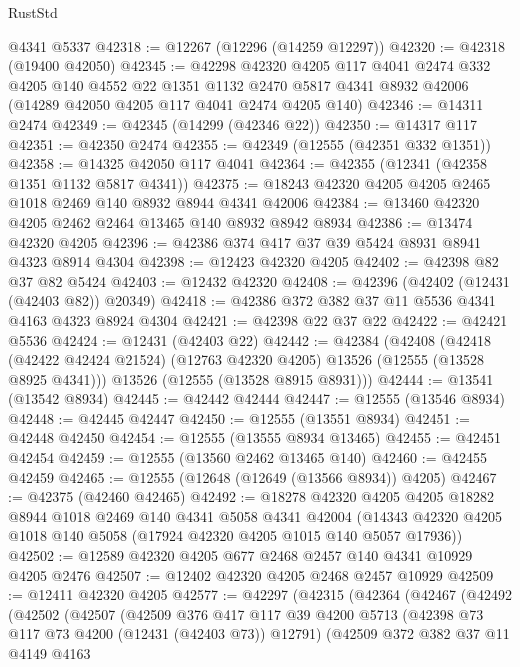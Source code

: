 \begin{lexlean}{RustStd}
\begin{coremodule}
    @4341
    @5337
@42318 := @12267 (@12296 (@14259 @12297))
@42320 := @42318 (@19400 @42050)
@42345 := @42298
    @42320
    @4205
    @117
    @4041
    @2474
    @332
    @4205
    @140
    @4552
    @22
    @1351
    @1132
    @2470
    @5817
    @4341
    @8932
    @42006
    (@14289 @42050 @4205 @117 @4041 @2474 @4205 @140)
@42346 := @14311 @2474
@42349 := @42345 (@14299 (@42346 @22))
@42350 := @14317 @117
@42351 := @42350 @2474
@42355 := @42349 (@12555 (@42351 @332 @1351))
@42358 := @14325 @42050 @117 @4041
@42364 := @42355 (@12341 (@42358 @1351 @1132 @5817 @4341))
@42375 := @18243 @42320 @4205 @4205 @2465 @1018 @2469 @140 @8932 @8944 @4341 @42006
@42384 := @13460 @42320 @4205 @2462 @2464 @13465 @140 @8932 @8942 @8934
@42386 := @13474 @42320 @4205
@42396 := @42386 @374 @417 @37 @39 @5424 @8931 @8941 @4323 @8914 @4304
@42398 := @12423 @42320 @4205
@42402 := @42398 @82 @37 @82 @5424
@42403 := @12432 @42320
@42408 := @42396 (@42402 (@12431 (@42403 @82)) @20349)
@42418 := @42386 @372 @382 @37 @11 @5536 @4341 @4163 @4323 @8924 @4304
@42421 := @42398 @22 @37 @22
@42422 := @42421 @5536
@42424 := @12431 (@42403 @22)
@42442 := @42384
    (@42408
      (@42418 (@42422 @42424 @21524) (@12763 @42320 @4205) @13526 (@12555 (@13528 @8925 @4341)))
      @13526
      (@12555 (@13528 @8915 @8931)))
@42444 := @13541 (@13542 @8934)
@42445 := @42442 @42444
@42447 := @12555 (@13546 @8934)
@42448 := @42445 @42447
@42450 := @12555 (@13551 @8934)
@42451 := @42448 @42450
@42454 := @12555 (@13555 @8934 @13465)
@42455 := @42451 @42454
@42459 := @12555 (@13560 @2462 @13465 @140)
@42460 := @42455 @42459
@42465 := @12555 (@12648 (@12649 (@13566 @8934)) @4205)
@42467 := @42375 (@42460 @42465)
@42492 := @18278
    @42320
    @4205
    @4205
    @18282
    @8944
    @1018
    @2469
    @140
    @4341
    @5058
    @4341
    @42004
    (@14343 @42320 @4205 @1018 @140 @5058 (@17924 @42320 @4205 @1015 @140 @5057 @17936))
@42502 := @12589 @42320 @4205 @677 @2468 @2457 @140 @4341 @10929 @4205 @2476
@42507 := @12402 @42320 @4205 @2468 @2457 @10929
@42509 := @12411 @42320 @4205
@42577 := @42297
    (@42315
      (@42364
        (@42467
          (@42492
            (@42502
              (@42507
                (@42509
                  @376
                  @417
                  @117
                  @39
                  @4200
                  @5713
                  (@42398 @73 @117 @73 @4200 (@12431 (@42403 @73)) @12791)
                  (@42509
                    @372
                    @382
                    @37
                    @11
                    @4149
                    @4163

\end{coremodule}
\end{lexlean}

